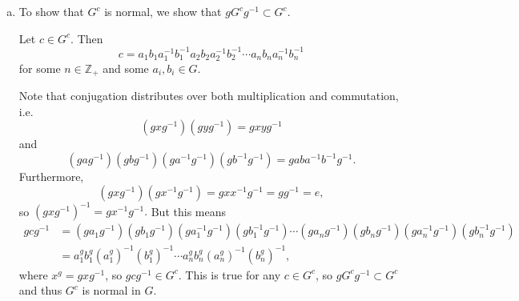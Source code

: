 \documentclass{article}
\begin{document}
\begin{Answer}
\begin{enumerate}[(a)]
  \item{To show that $G^c$ is normal, we show that 
        $g G^c g^{-1} \subset G^c$. 

        Let $c \in G^c$. Then
        $$
        c = a_1 b_1 a_1^{-1} b_1^{-1}
            a_2 b_2 a_2^{-1} b_2^{-1}
            \cdots
            a_n b_n a_n^{-1} b_n^{-1}
        $$
        for some $n \in \mathbb{Z}_+$ and some $a_i, b_i \in G$.

        Note that conjugation
        distributes over both multiplication and commutation, i.e.
        $$
        (g x g^{-1}) (g y g^{-1}) = g x y g^{-1}
        $$
        and
        $$
        (g a g^{-1})
        (g b g^{-1})
        (g a^{-1} g^{-1})
        (g b^{-1} g^{-1})
      = g a b a^{-1} b^{-1} g^{-1}.
        $$
        Furthermore,
        $$
        (g x g^{-1})(g x^{-1} g^{-1}) = g x x^{-1} g^{-1} = g g^{-1} = e,
        $$
        so $(g x g^{-1})^{-1} = g x^{-1} g^{-1}.$
        But this means
        \begin{align*}
        g c g^{-1} &= (g a_1 g^{-1})(g b_1 g^{-1})
                     (g a_1^{-1} g^{-1})(g b_1^{-1} g^{-1})
                     \cdots
                     (g a_n g^{-1})(g b_n g^{-1})
                     (g a_n^{-1} g^{-1})(g b_n^{-1} g^{-1}) \\
                  &= a_1^g b_1^g (a_1^g)^{-1} (b_1^g)^{-1}
                     \cdots
                     a_n^g b_n^g (a_n^g)^{-1} (b_n^g)^{-1},
        \end{align*}
        where $x^g = g x g^{-1}$, so $g c g^{-1} \in G^c$. This is
        true for any $c \in G^c$, so $g G^c g^{-1} \subset G^c$ and
        thus $G^c$ is normal in $G$.

}
\end{enumerate}
\end{Answer}
\end{document}
